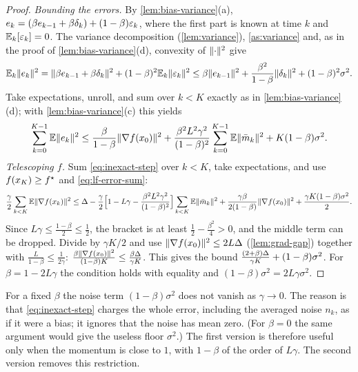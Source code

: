 \begin{proof}
\emph{Bounding the errors.} By \cref{lem:bias-variance}(a), $e_k=(\beta e_{k-1}+\beta\delta_k)+(1-\beta)\varepsilon_k$,
where the first part is known at time $k$ and $\mathbb{E}_k[\varepsilon_k]=0$. The variance decomposition
(\cref{lem:variance}), \cref{as:variance} and, as in the proof of
\cref{lem:bias-variance}(d), convexity of $\lVert \cdot\rVert^2$ give
\[
  \mathbb{E}_k\lVert e_k\rVert^2=\lVert \beta e_{k-1}+\beta\delta_k\rVert^2+(1-\beta)^2\mathbb{E}_k\lVert \varepsilon_k\rVert^2
  \le\beta\lVert e_{k-1}\rVert^2+\frac{\beta^2}{1-\beta}\lVert \delta_k\rVert^2+(1-\beta)^2\sigma^2 .
\]
Take expectations, unroll, and sum over $k<K$ exactly as in \cref{lem:bias-variance}(d);
with \cref{lem:bias-variance}(c) this yields
\begin{equation}\label{eq:lf-error-sum}
  \sum_{k=0}^{K-1}\mathbb{E}\lVert e_k\rVert^2\le\frac{\beta}{1-\beta}\lVert \nabla f(x_0)\rVert^2
  +\frac{\beta^2L^2\gamma^2}{(1-\beta)^2}\sum_{k=0}^{K-1}\mathbb{E}\lVert \bar m_k\rVert^2+K(1-\beta)\sigma^2 .
\end{equation}
\emph{Telescoping $f$.} Sum \eqref{eq:inexact-step} over $k<K$, take expectations, and use
$f(x_K)\ge f^\star$ and \eqref{eq:lf-error-sum}:
\[
  \frac\gamma2\sum_{k<K}\mathbb{E}\lVert \nabla f(x_k)\rVert^2\le\Delta
  -\frac\gamma2\Bigl[1-L\gamma-\frac{\beta^2L^2\gamma^2}{(1-\beta)^2}\Bigr]\sum_{k<K}\mathbb{E}\lVert \bar m_k\rVert^2
  +\frac{\gamma\beta}{2(1-\beta)}\lVert \nabla f(x_0)\rVert^2+\frac{\gamma K(1-\beta)\sigma^2}{2}.
\]
Since $L\gamma\le\frac{1-\beta}{2}\le\frac12$, the bracket is at least
$\frac12-\frac{\beta^2}{4}>0$, and the middle term can be dropped. Divide by $\gamma K/2$ and use
$\lVert \nabla f(x_0)\rVert^2\le2L\Delta$ (\cref{lem:grad-gap}) together with
$\frac{L}{1-\beta}\le\frac1{2\gamma}$:
$\frac{\beta\lVert \nabla f(x_0)\rVert^2}{(1-\beta)K}\le\frac{\beta\Delta}{\gamma K}$. This gives the bound
$\frac{(2+\beta)\Delta}{\gamma K}+(1-\beta)\sigma^2$. For $\beta=1-2L\gamma$ the condition holds with
equality and $(1-\beta)\sigma^2=2L\gamma\sigma^2$.
\end{proof}

\begin{remark}
For a fixed $\beta$ the noise term $(1-\beta)\sigma^2$ does not vanish as $\gamma\to0$. The
reason is that \eqref{eq:inexact-step} charges the whole error, including the averaged noise
$n_k$, as if it were a bias; it ignores that the noise has mean zero. (For $\beta=0$ the same
argument would give the useless floor $\sigma^2$.) The first version is therefore useful only
when the momentum is close to $1$, with $1-\beta$ of the order of $L\gamma$. The second
version removes this restriction.
\end{remark}

